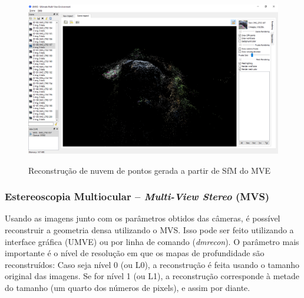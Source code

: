 \begin{figure}[!h]
	\centering
		\caption{%
  Reconstrução de nuvem de pontos gerada a partir de
  SfM do MVE%
	}
	\includegraphics[width=\linewidth]{figs/umve5sfm.png}
	\label{fig:mvesfm}
\end{figure}


%
\subsubsection{Estereoscopia Multiocular -- \emph{Multi-View Stereo} (MVS)}

Usando as imagens junto com os parâmetros obtidos das câmeras, é possível
reconstruir a geometria densa utilizando o MVS. Isso pode ser feito utilizando a
interface gráfica (UMVE) ou por linha de comando (\emph{dmrecon}).
O parâmetro mais importante é o nível de resolução em que os mapas de
profundidade são reconstruídos: Caso seja nível 0 (ou L0), a reconstrução é
feita usando o tamanho original das imagens. Se for nível 1 (ou L1), a
reconstrução corresponde à metade do tamanho (um quarto dos números de pixels),
e assim por diante.

